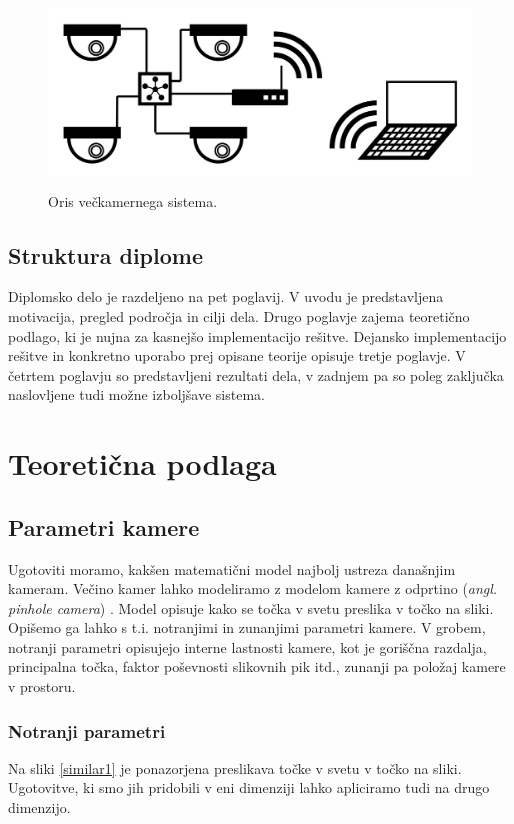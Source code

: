 \documentclass[a4paper, 12pt]{book}
\begin{document}
\begin{figure}[H]
\centering
\includegraphics[height=5cm]{topology.png}
\caption{Oris večkamernega sistema.}
\label{topologyimg}
\end{figure}

\section{Struktura diplome}
Diplomsko delo je razdeljeno na pet poglavij. V uvodu je predstavljena motivacija, pregled področja in cilji dela. Drugo poglavje zajema teoretično podlago, ki je nujna za kasnejšo implementacijo rešitve. Dejansko implementacijo rešitve in konkretno uporabo prej opisane teorije opisuje tretje poglavje. V četrtem poglavju so predstavljeni rezultati dela, v zadnjem pa so poleg zaključka naslovljene tudi možne izboljšave sistema.

\chapter{Teoretična podlaga}
\section{Parametri kamere}\label{parametri}
Ugotoviti moramo, kakšen matematični model najbolj ustreza današnjim kameram. Večino kamer lahko modeliramo z modelom kamere z odprtino (\emph{angl. pinhole camera}) \cite{Hartley2004, zhang2000flexible, zhang1995robust}. Model opisuje kako se točka v svetu preslika v točko na sliki. Opišemo ga lahko s t.i. notranjimi in zunanjimi parametri kamere. V grobem, notranji parametri opisujejo interne lastnosti kamere, kot je goriščna razdalja, principalna točka, faktor poševnosti slikovnih pik itd., zunanji pa položaj kamere v prostoru.

\subsection{Notranji parametri}
Na sliki \ref{similar1} je ponazorjena preslikava točke v svetu v točko na sliki. Ugotovitve, ki smo jih pridobili v eni dimenziji lahko apliciramo tudi na drugo dimenzijo. 
\end{document}
